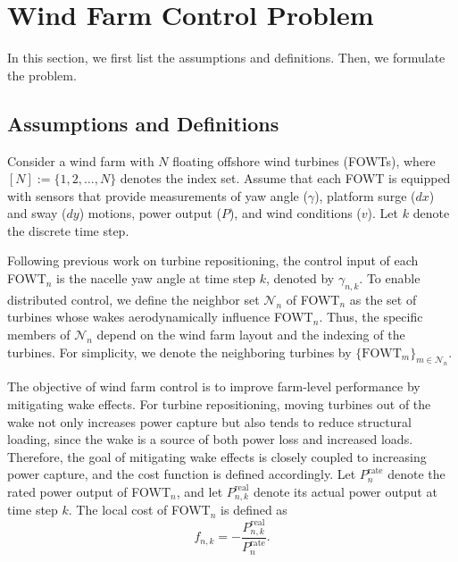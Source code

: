 \section{Wind Farm Control Problem} \label{sec:problem}
In this section, we first list the assumptions and definitions. Then, we formulate the problem.

\subsection{Assumptions and Definitions} \label{sec:definition}
Consider a wind farm with $N$ floating offshore wind turbines (FOWTs), where $[N]:=\{1,2,\dots,N\}$ denotes the index set. Assume that each FOWT is equipped with sensors that provide measurements of yaw angle ($\gamma$), platform surge ($dx$) and sway ($dy$) motions, power output ($P$), and wind conditions ($v$). Let $k$ denote the discrete time step.

Following previous work on turbine repositioning, the control input of each FOWT$_n$ is the nacelle yaw angle at time step $k$, denoted by $\gamma_{n,k}$. To enable distributed control, we define the neighbor set $\mathcal{N}_n$ of FOWT$_n$ as the set of turbines whose wakes aerodynamically influence FOWT$_n$. Thus, the specific members of $\mathcal{N}_n$ depend on the wind farm layout and the indexing of the turbines. For simplicity, we denote the neighboring turbines by $\{\text{FOWT}_m\}_{m \in \mathcal{N}_n}$.

The objective of wind farm control is to improve farm-level performance by mitigating wake effects. For turbine repositioning, moving turbines out of the wake not only increases power capture but also tends to reduce structural loading, since the wake is a source of both power loss and increased loads. Therefore, the goal of mitigating wake effects is closely coupled to increasing power capture, and the cost function is defined accordingly. Let $P_n^{\text{rate}}$ denote the rated power output of FOWT$_n$, and let $P_{n,k}^{\text{real}}$ denote its actual power output at time step $k$. The local cost of FOWT$_n$ is defined as
\begin{equation} \label{eq:cost_def}
    f_{n,k} = - \frac{P_{n,k}^{\text{real}}}{P_n^{\text{rate}}} .
\end{equation}

